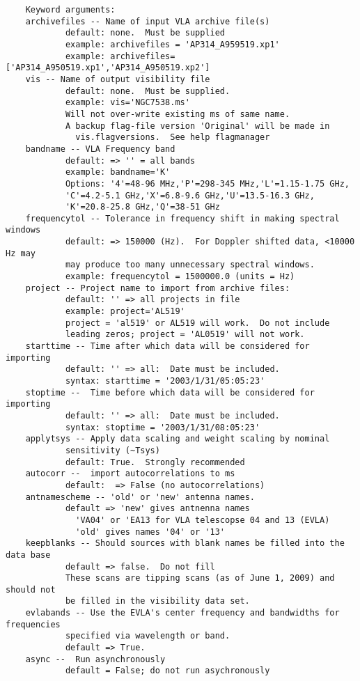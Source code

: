 \begin{verbatim}
    Keyword arguments:
    archivefiles -- Name of input VLA archive file(s)
            default: none.  Must be supplied
            example: archivefiles = 'AP314_A959519.xp1'
            example: archivefiles=['AP314_A950519.xp1','AP314_A950519.xp2']
    vis -- Name of output visibility file
            default: none.  Must be supplied.
            example: vis='NGC7538.ms'
            Will not over-write existing ms of same name.
            A backup flag-file version 'Original' will be made in
              vis.flagversions.  See help flagmanager
    bandname -- VLA Frequency band
            default: => '' = all bands
            example: bandname='K'
            Options: '4'=48-96 MHz,'P'=298-345 MHz,'L'=1.15-1.75 GHz,
            'C'=4.2-5.1 GHz,'X'=6.8-9.6 GHz,'U'=13.5-16.3 GHz,
            'K'=20.8-25.8 GHz,'Q'=38-51 GHz
    frequencytol -- Tolerance in frequency shift in making spectral windows
            default: => 150000 (Hz).  For Doppler shifted data, <10000 Hz may
            may produce too many unnecessary spectral windows.
            example: frequencytol = 1500000.0 (units = Hz)
    project -- Project name to import from archive files:
            default: '' => all projects in file
            example: project='AL519'
            project = 'al519' or AL519 will work.  Do not include
            leading zeros; project = 'AL0519' will not work.
    starttime -- Time after which data will be considered for importing
            default: '' => all:  Date must be included.
            syntax: starttime = '2003/1/31/05:05:23'
    stoptime --  Time before which data will be considered for importing
            default: '' => all:  Date must be included.
            syntax: stoptime = '2003/1/31/08:05:23'
    applytsys -- Apply data scaling and weight scaling by nominal
            sensitivity (~Tsys)
            default: True.  Strongly recommended
    autocorr --  import autocorrelations to ms
            default:  => False (no autocorrelations)
    antnamescheme -- 'old' or 'new' antenna names.
            default => 'new' gives antnenna names
              'VA04' or 'EA13 for VLA telescopse 04 and 13 (EVLA)
              'old' gives names '04' or '13'
    keepblanks -- Should sources with blank names be filled into the data base
            default => false.  Do not fill
            These scans are tipping scans (as of June 1, 2009) and should not
            be filled in the visibility data set.
    evlabands -- Use the EVLA's center frequency and bandwidths for frequencies
            specified via wavelength or band. 
            default => True. 
    async --  Run asynchronously
            default = False; do not run asychronously

\end{verbatim}
\normalsize

